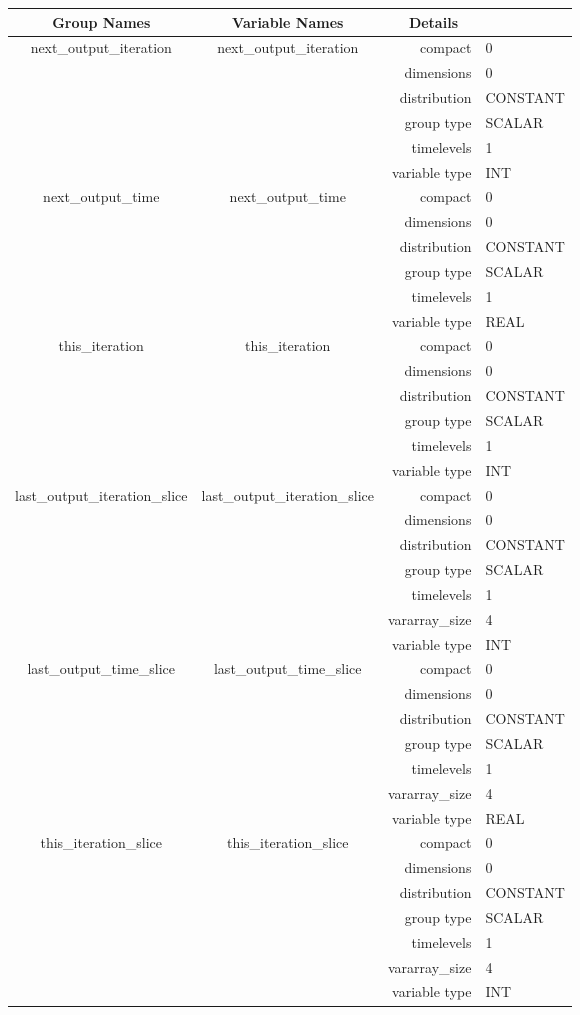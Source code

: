 \documentclass{article}
\begin{document}
\begin{tabular*}{150mm}{|c|c@{\extracolsep{\fill}}|rl|} \hline 
~ {\bf Group Names} ~ & ~ {\bf Variable Names} ~  &{\bf Details} ~ & ~\\ 
\hline 
next\_output\_iteration & next\_output\_iteration & compact & 0 \\ 
 &  & dimensions & 0 \\ 
 &  & distribution & CONSTANT \\ 
 &  & group type & SCALAR \\ 
 &  & timelevels & 1 \\ 
 &  & variable type & INT \\ 
\hline 
next\_output\_time & next\_output\_time & compact & 0 \\ 
 &  & dimensions & 0 \\ 
 &  & distribution & CONSTANT \\ 
 &  & group type & SCALAR \\ 
 &  & timelevels & 1 \\ 
 &  & variable type & REAL \\ 
\hline 
this\_iteration & this\_iteration & compact & 0 \\ 
 &  & dimensions & 0 \\ 
 &  & distribution & CONSTANT \\ 
 &  & group type & SCALAR \\ 
 &  & timelevels & 1 \\ 
 &  & variable type & INT \\ 
\hline 
last\_output\_iteration\_slice & last\_output\_iteration\_slice & compact & 0 \\ 
 &  & dimensions & 0 \\ 
 &  & distribution & CONSTANT \\ 
 &  & group type & SCALAR \\ 
 &  & timelevels & 1 \\ 
 &  & vararray\_size & 4 \\ 
 &  & variable type & INT \\ 
\hline 
last\_output\_time\_slice & last\_output\_time\_slice & compact & 0 \\ 
 &  & dimensions & 0 \\ 
 &  & distribution & CONSTANT \\ 
 &  & group type & SCALAR \\ 
 &  & timelevels & 1 \\ 
 &  & vararray\_size & 4 \\ 
 &  & variable type & REAL \\ 
\hline 
this\_iteration\_slice & this\_iteration\_slice & compact & 0 \\ 
 &  & dimensions & 0 \\ 
 &  & distribution & CONSTANT \\ 
 &  & group type & SCALAR \\ 
 &  & timelevels & 1 \\ 
 &  & vararray\_size & 4 \\ 
 &  & variable type & INT \\ 
\hline 
\end{tabular*} 
\end{document}
